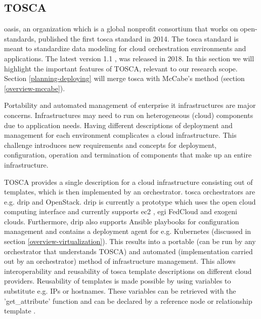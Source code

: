 \subsection{TOSCA}
\label{overview-tosca}
\gls{oasis}, an organization which is a global nonprofit consortium that works on open-standards, published the first \gls{tosca} standard in 2014. The \gls{tosca} standard is meant to standardize data modeling for cloud orchestration environments and applications. The latest version 1.1 \cite{tosca-standard}, was released in 2018. In this section we will highlight the important features of TOSCA, relevant to our research scope. Section \ref{planning-deploying} will merge \gls{tosca} with McCabe's method (section \ref{overview-mccabe}).

Portability and automated management of enterprise \gls{it} infrastructures are major concerns. Infrastructures may need to run on heterogeneous (cloud) components due to application needs. Having different descriptions of deployment and management for each environment complicates a cloud infrastructure. This challenge introduces new requirements and concepts for deployment, configuration, operation and termination of components that make up an entire infrastructure.

TOSCA provides a single description for a cloud infrastructure consisting out of templates, which is then implemented by an orchestrator. \gls{tosca} orchestrators are e.g. \gls{drip} and OpenStack. \gls{drip} is currently a prototype which uses the open cloud computing interface and currently supports \gls{ec2} \cite{amazon-website}, \gls{egi} FedCloud \cite{egi-website} and \gls{exogeni} \cite{exogeni-website} clouds. Furthermore, \gls{drip} also supports Ansible playbooks \cite{ansible-website} for configuration management and contains a deployment agent for e.g. Kubernetes (discussed in section \ref{overview-virtualization}). This results into a portable (can be run by any orchestrator that understands TOSCA) and automated (implementation carried out by an orchestrator) method of infrastructure management. This allows interoperability and reusability of \gls{tosca} template descriptions on different cloud providers. Reusability of templates is made possible by using variables to substitute e.g. IPs or hostnames. These variables can be retrieved with the 'get\_attribute' function and can be declared by a reference node or relationship template \cite{tosca-attributes}.


